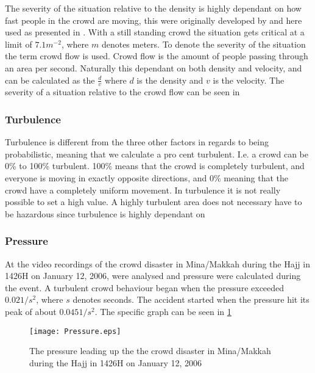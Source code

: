 The severity of the situation relative to the density is highly dependant on how fast people in the crowd are moving, this were originally developed by \citet{crowdDistasters} and here used as presented in \citet{wirz2013probing}. With a still standing crowd the situation gets critical at a limit of $7.1 m^{-2}$, where $m$ denotes meters. To denote the severity of the situation the term crowd flow is used. Crowd flow is the amount of people passing through an area per second. Naturally this dependant on both density and velocity, and can be calculated as the $\frac{d}{v}$ where $d$ is the density and $v$ is the velocity. The severity of a situation relative to the crowd flow can be seen in 

\subsubsection{Turbulence}
Turbulence is different from the three other factors in regards to being probabilistic, meaning that we calculate a pro cent turbulent. I.e. a crowd can be 0\% to 100\% turbulent. 100\% means that the crowd is completely turbulent, and everyone is moving in exactly opposite directions, and 0\% meaning that the crowd have a completely uniform movement. In turbulence it is not really possible to set a high value. A highly turbulent area does not necessary have to be hazardous  since turbulence is highly dependant on 

\subsubsection{Pressure}
At \citet{empircalstudy} the video recordings of the crowd disaster in Mina/Makkah during the Hajj in 1426H on January 12, 2006, were analysed and pressure were calculated during the event. A turbulent crowd behaviour began when the pressure exceeded $0.02 1/s^2$, where $s$ denotes seconds. The accident started when the pressure hit its peak of about $0.045 1/s^2$. The specific graph can be seen in \cref{mekkahCrowdDistaster206}

\begin{figure}
    \centering
    \texttt{[image: Pressure.eps]}
    \caption{The pressure leading up the the crowd disaster in Mina/Makkah during the Hajj in 1426H on January 12, 2006 \cite{empircalstudy}}
    \label{mekkahCrowdDistaster206}
\end{figure}

